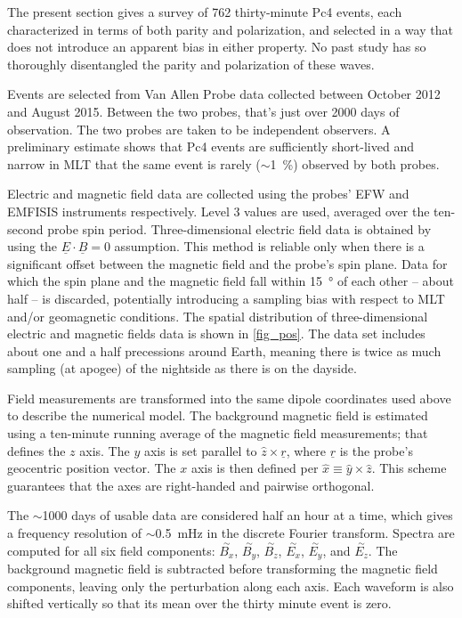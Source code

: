 \documentclass{article}
\newcommand{\about}{\ensuremath{\sim}}
\newcommand{\dft}[1]{\ensuremath{\overset{\sim}{#1}}\xspace}
\newcommand{\x}{\ensuremath{x}\xspace}
\newcommand{\y}{\ensuremath{y}\xspace}
\newcommand{\z}{\ensuremath{z}\xspace}
\newcommand{\xhat}{\ensuremath{\hat{x}}\xspace}
\newcommand{\yhat}{\ensuremath{\hat{y}}\xspace}
\newcommand{\zhat}{\ensuremath{\hat{z}}\xspace}
\renewcommand{\vec}[1]{\ensuremath{\underline{#1}}}
\begin{document}
The present section gives a survey of 762 thirty-minute Pc4 events, each characterized in terms of both parity and polarization, and selected in a way that does not introduce an apparent bias in either property. No past study has so thoroughly disentangled the parity and polarization of these waves.

Events are selected from Van Allen Probe data collected between October 2012 and August 2015. Between the two probes, that's just over 2000 days of observation. The two probes are taken to be independent observers. A preliminary estimate shows that Pc4 events are sufficiently short-lived and narrow in MLT that the same event is rarely (\about\SI{1}{\percent}) observed by both probes.

Electric and magnetic field data are collected using the probes' EFW\cite{wygant_2013} and EMFISIS instruments respectively. Level 3 values are used, averaged over the ten-second probe spin period. Three-dimensional electric field data is obtained by using the $\vec{E} \cdot \vec{B} = 0$ assumption. This method is reliable only when there is a significant offset between the magnetic field and the probe's spin plane. Data for which the spin plane and the magnetic field fall within \SI{15}{\degree} of each other -- about half -- is discarded, potentially introducing a sampling bias with respect to MLT and/or geomagnetic conditions. The spatial distribution of three-dimensional electric and magnetic fields data is shown in \cref{fig_pos}. The data set includes about one and a half precessions around Earth, meaning there is twice as much sampling (at apogee) of the nightside as there is on the dayside.

Field measurements are transformed into the same dipole coordinates used above to describe the numerical model. The background magnetic field is estimated using a ten-minute running average of the magnetic field
measurements; that defines the \z axis. The \y axis is set parallel to $\zhat \times \vec{r}$, where \vec{r} is the probe's geocentric position vector. The \x axis is then defined per $\xhat \equiv \yhat \times \zhat$. This scheme guarantees that the axes are right-handed and pairwise orthogonal\cite{liu_2009}.

The \about1000 days of usable data are considered half an hour at a time, which gives a frequency resolution of \about\SI{0.5}{\mHz} in the discrete Fourier transform. Spectra are computed for all six field components: \dft{B_x}, \dft{B_y}, \dft{B_z}, \dft{E_x}, \dft{E_y}, and \dft{E_z}. The background
magnetic field is subtracted before transforming the magnetic field components, leaving only the perturbation along each axis. Each waveform is also shifted vertically so that its mean over the thirty
minute event is zero.
\end{document}
